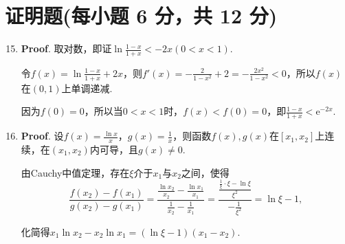\documentclass[../Main.tex]{subfiles}
\begin{document}
\section{证明题(每小题 6 分，共 12 分)}
\begin{enumerate}
    \setcounter{enumi}{14}
    \item \textbf{Proof}. 取对数，即证$\ln\frac{1-x}{1+x}<-2x(0<x<1)$.

          令$f(x)=\ln\frac{1-x}{1+x}+2x$，则$f'(x)=-\frac{2}{1-x^{2}}+2=-\frac{2x^{2}}{1-x^{2}}
              <0$，所以$f(x)$在$(0,1)$上单调递减.

          因为$f(0)=0$，所以当$0<x<1$时，$f(x)<f(0)=0$，即$\frac{1-x}{1+x}<\mathrm{e}
              ^{-2x}$.

    \item \textbf{Proof}. 设$f(x)=\frac{\ln x}{x}$，$g(x)=\frac{1}{x}$，则函数$f
              (x),g(x)$在$[x_{1},x_{2}]$上连续，在$(x_{1},x_{2})$内可导，且$g(x)\neq0$.

          由Cauchy中值定理，存在$\xi$介于$x_{1}$与$x_{2}$之间，使得
          \[
              \frac{f(x_{2})-f(x_{1})}{g(x_{2})-g(x_{1})}=\frac{\frac{\ln x_{2}}{x_{2}}-\frac{\ln
                      x_{1}}{x_{1}}}{\frac{1}{x_{2}}-\frac{1}{x_{1}}}=\frac{\frac{\frac{1}{\xi}\cdot
                      \xi-\ln\xi}{\xi^{2}}}{-\frac{1}{\xi^{2}}}=\ln\xi-1,
          \]

          化简得$x_{1}\ln x_{2}-x_{2}\ln x_{1}=(\ln\xi-1)(x_{1}-x_{2})$.
\end{enumerate}
\end{document}
